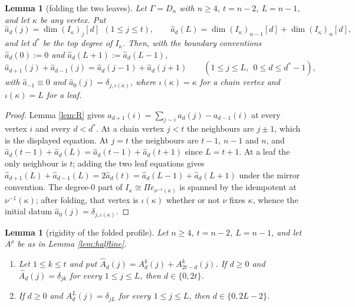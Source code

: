 \documentclass[reqno]{amsart}
\theoremstyle{plain}
\newtheorem{lemma}[theorem]{Lemma}
\theoremstyle{definition}
\newcommand{\ka}{\kappa}
\newcommand{\Pia}{\Pi}
\begin{document}
\begin{lemma}[folding the two leaves]\label{lem:fold}
Let $\Gamma=D_n$ with $n\ge4$, $t=n-2$, $L=n-1$, and let $\ka$ be any vertex.
Put
\[
   \hat a_d(j)=\dim(I_\ka)_j[d]\ \ (1\le j\le t),
   \qquad
   \hat a_d(L)=\dim(I_\ka)_{n-1}[d]+\dim(I_\ka)_{n}[d],
\]
and let $d^{*}$ be the top degree of $I_\ka$.  Then, with the boundary
conventions $\hat a_d(0):=0$ and $\hat a_d(L+1):=\hat a_d(L-1)$,
\[
   \hat a_{d+1}(j)+\hat a_{d-1}(j)=\hat a_d(j-1)+\hat a_d(j+1)
   \qquad(1\le j\le L,\ \ 0\le d\le d^{*}-1),
\]
with $\hat a_{-1}\equiv0$ and $\hat a_0(j)=\delta_{j,\iota(\ka)}$, where
$\iota(\ka)=\ka$ for a chain vertex and $\iota(\ka)=L$ for a leaf.
\end{lemma}

\begin{proof}
Lemma \ref{lem:R} gives $a_{d+1}(i)=\sum_{j\sim i}a_d(j)-a_{d-1}(i)$ at every
vertex $i$ and every $d<d^{*}$.  At a chain vertex $j<t$ the neighbours are
$j\pm1$, which is the displayed equation.  At $j=t$ the neighbours are $t-1$,
$n-1$ and $n$, and $\hat a_d(t-1)+\hat a_d(L)=\hat a_d(t-1)+\hat a_d(t+1)$
since $L=t+1$.  At a leaf the only neighbour is $t$; adding the two leaf
equations gives $\hat a_{d+1}(L)+\hat a_{d-1}(L)=2\hat a_d(t)
=\hat a_d(L-1)+\hat a_d(L+1)$ under the mirror convention.  The degree-$0$
part of $I_\ka\cong\Pia e_{\nu^{-1}(\ka)}$ is spanned by the idempotent at
$\nu^{-1}(\ka)$; after folding, that vertex is $\iota(\ka)$ whether or not
$\nu$ fixes $\ka$, whence the initial datum $\hat a_0(j)=\delta_{j,\iota(\ka)}$.
\end{proof}

\begin{lemma}[rigidity of the folded profile]\label{lem:rigid}
Let $n\ge4$, $t=n-2$, $L=n-1$, and let $A^{\rho}$ be as in Lemma
\ref{lem:halfline}.
\begin{enumerate}
\item[\textup{(a)}] Let $1\le k\le t$ and put
$\hat A_d(j)=A^{k}_d(j)+A^{k}_{2t-d}(j)$.  If $d\ge0$ and
$\hat A_d(j)=\delta_{jk}$ for every $1\le j\le L$, then $d\in\{0,2t\}$.
\item[\textup{(b)}] If $d\ge0$ and $A^{L}_d(j)=\delta_{jL}$ for every
$1\le j\le L$, then $d\in\{0,2L-2\}$.
\end{enumerate}
\end{lemma}
\end{document}
